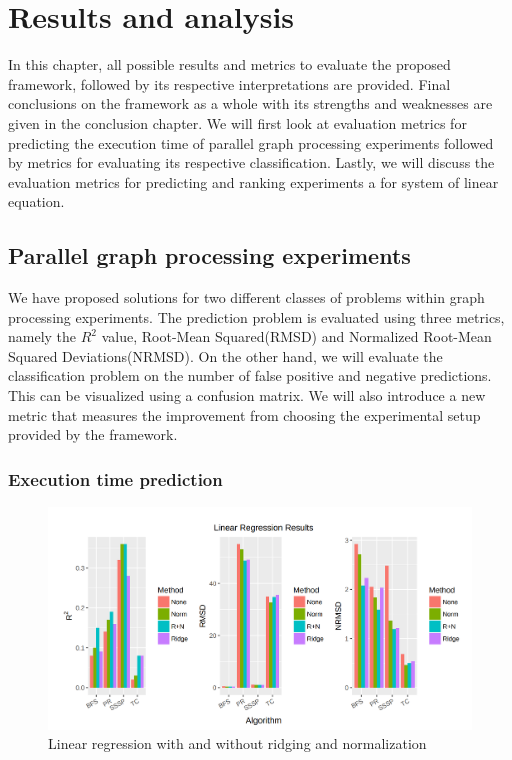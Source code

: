 
\chapter{Results and analysis} 
In this chapter, all possible results and metrics to evaluate the proposed framework, followed by its respective interpretations are provided. Final conclusions on the framework as a whole with its strengths and weaknesses are given in the conclusion chapter.  We will first look at evaluation metrics for predicting the execution time of parallel graph processing experiments followed by metrics for evaluating its respective classification. Lastly, we will discuss the evaluation metrics for predicting and ranking experiments a for system of linear equation. 
\section{Parallel graph processing experiments}
We have proposed solutions for two different classes of problems within graph processing experiments. The prediction problem is evaluated using three metrics, namely the $R^2$ value, Root-Mean Squared(RMSD) and Normalized Root-Mean Squared Deviations(NRMSD).
On the other hand, we will evaluate the classification problem on the number of false positive and negative predictions. This can be visualized using a confusion matrix. We will also introduce a new metric that measures the improvement from choosing the experimental setup provided by the framework.

\subsection{Execution time prediction}

\begin{figure}
    \centering
    \includegraphics[width=1\columnwidth]{figures/regression_results.png}
    \caption{Linear regression with and without ridging and normalization}
    \label{Linear regression with and without ridging and normalization}
\end{figure}

